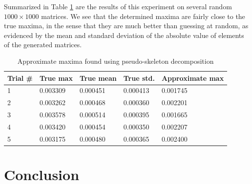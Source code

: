 \documentclass{article}
\begin{document}
	Summarized in Table \ref{table:approximate_maxima} are the results of this experiment on several random $1000\times1000$ matrices. We see that the determined maxima are fairly close to the true maxima, in the sense that they are much better than guessing at random, as evidenced by the mean and standard deviation of the absolute value of elements of the generated matrices.
	\begin{table}
		\centering
		\begin{tabular}{@{}lllll@{}}
			\toprule
			Trial \# & True max & True mean & True std. & Approximate max\\
			\midrule
			1 & 0.003309 & 0.000451 & 0.000413 & 0.001745\\
			2 & 0.003262 & 0.000468 & 0.000360 & 0.002201\\
			3 & 0.003578 & 0.000514 & 0.000395 & 0.001665\\
			4 & 0.003420 & 0.000454 & 0.000350 & 0.002207\\
			5 & 0.003175 & 0.000480 & 0.000365 & 0.002400\\
			\bottomrule
		\end{tabular}
		\caption{Approximate maxima found using pseudo-skeleton decomposition}
		\label{table:approximate_maxima}
	\end{table}
	
	\section{Conclusion}
	
	
	
\end{document}
